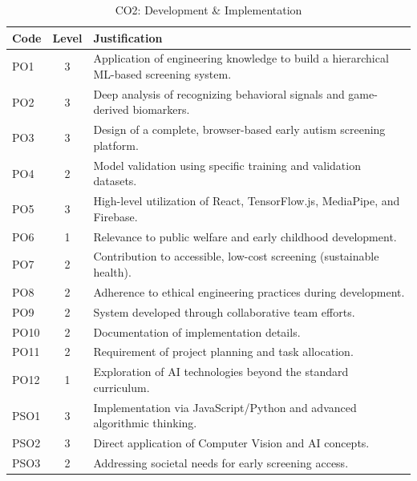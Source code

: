 \documentclass[12pt,a4paper]{report}
\begin{document}
\begin{table}[h!]
    \centering
    \caption{CO2: Development \& Implementation}
    \renewcommand{\arraystretch}{1.3}
    \begin{tabularx}{\textwidth}{@{}l c X@{}}
        \toprule
        \textbf{Code} & \textbf{Level} & \textbf{Justification} \\
        \midrule
        PO1 & 3 & Application of engineering knowledge to build a hierarchical ML-based screening system. \\
        PO2 & 3 & Deep analysis of recognizing behavioral signals and game-derived biomarkers. \\
        PO3 & 3 & Design of a complete, browser-based early autism screening platform. \\
        PO4 & 2 & Model validation using specific training and validation datasets. \\
        PO5 & 3 & High-level utilization of React, TensorFlow.js, MediaPipe, and Firebase. \\
        PO6 & 1 & Relevance to public welfare and early childhood development. \\
        PO7 & 2 & Contribution to accessible, low-cost screening (sustainable health). \\
        PO8 & 2 & Adherence to ethical engineering practices during development. \\
        PO9 & 2 & System developed through collaborative team efforts. \\
        PO10 & 2 & Documentation of implementation details. \\
        PO11 & 2 & Requirement of project planning and task allocation. \\
        PO12 & 1 & Exploration of AI technologies beyond the standard curriculum. \\
        PSO1 & 3 & Implementation via JavaScript/Python and advanced algorithmic thinking. \\
        PSO2 & 3 & Direct application of Computer Vision and AI concepts. \\
        PSO3 & 2 & Addressing societal needs for early screening access. \\
        \bottomrule
    \end{tabularx}
\end{table}
\end{document}

